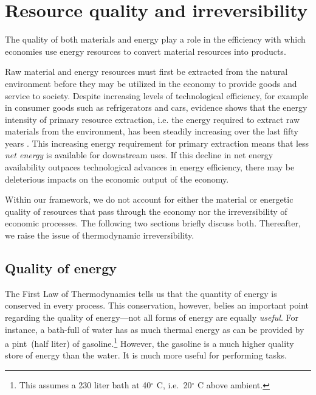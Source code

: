 \section{Resource quality and irreversibility}
\label{sec:resource_quality_and_irreversibility}

The quality of both materials 
and energy play a role in the 
efficiency with which economies use energy resources to 
convert material resources into products.

Raw material and energy resources must first 
be extracted from the natural environment 
before they may be utilized in the economy 
to provide goods and service to society. 
Despite increasing levels of technological efficiency, 
for example in consumer goods such as refrigerators and cars, 
evidence shows that 
the energy intensity of primary resource extraction, 
i.e. the energy required to extract raw materials 
from the environment, 
has been steadily increasing over 
the last fifty years \cite{Hall1986, Mudd2010, Brandt2011}. 
This increasing energy requirement for 
primary extraction means that 
less \textit{net energy} is available 
for downstream uses. 
If this decline in net energy availability 
outpaces technological advances in energy efficiency, 
there may be deleterious impacts on the 
economic output of the economy.

Within our framework, we do not account for either
the material or energetic quality of resources 
that pass through the economy nor the 
irreversibility of economic processes.
The following two sections briefly discuss both.
Thereafter, we raise the issue of thermodynamic irreversibility.



\subsection{Quality of energy}
\label{sec:energy_quality}

The First Law of Thermodynamics tells us that
the quantity of energy is conserved in every process.
This conservation, however, belies an important point
regarding the quality of energy---not
all forms of energy are equally \emph{useful}.
For instance,
a bath-full of water has as much thermal energy
as can be provided by a pint~(half liter) of
gasoline.\footnote{This assumes a 230 liter bath at
40$^\circ$ C,
i.e.\ 20$^\circ$ C above ambient.}
However, the gasoline is a much higher quality
store of energy than the water.
It is much more useful for performing tasks.

